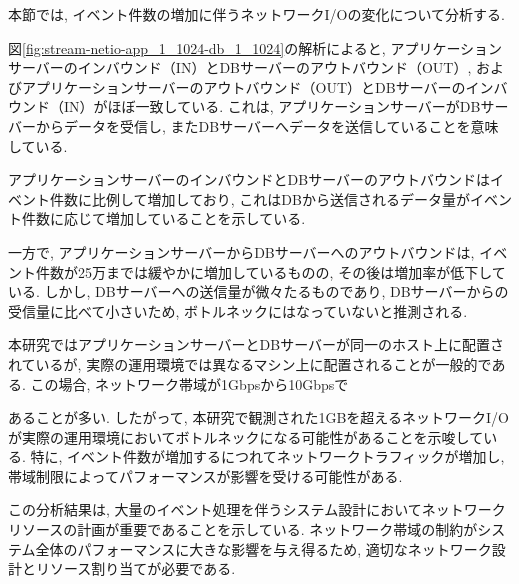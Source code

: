 \documentclass[../../../../../main]{subfiles}
\begin{document}
    \label{subsubsec:result-streaming-only-limit-diskio}

    本節では, イベント件数の増加に伴うネットワークI/Oの変化について分析する.

    

    図\ref{fig:stream-netio-app_1_1024-db_1_1024}の解析によると, アプリケーションサーバーのインバウンド（IN）とDBサーバーのアウトバウンド（OUT）, およびアプリケーションサーバーのアウトバウンド（OUT）とDBサーバーのインバウンド（IN）がほぼ一致している. これは, アプリケーションサーバーがDBサーバーからデータを受信し, またDBサーバーへデータを送信していることを意味している.

    アプリケーションサーバーのインバウンドとDBサーバーのアウトバウンドはイベント件数に比例して増加しており, これはDBから送信されるデータ量がイベント件数に応じて増加していることを示している.

    一方で, アプリケーションサーバーからDBサーバーへのアウトバウンドは, イベント件数が25万までは緩やかに増加しているものの, その後は増加率が低下している. しかし, DBサーバーへの送信量が微々たるものであり, DBサーバーからの受信量に比べて小さいため, ボトルネックにはなっていないと推測される.

    本研究ではアプリケーションサーバーとDBサーバーが同一のホスト上に配置されているが, 実際の運用環境では異なるマシン上に配置されることが一般的である. この場合, ネットワーク帯域が1Gbpsから10Gbpsで

    あることが多い. したがって, 本研究で観測された1GBを超えるネットワークI/Oが実際の運用環境においてボトルネックになる可能性があることを示唆している. 特に, イベント件数が増加するにつれてネットワークトラフィックが増加し, 帯域制限によってパフォーマンスが影響を受ける可能性がある.

    この分析結果は, 大量のイベント処理を伴うシステム設計においてネットワークリソースの計画が重要であることを示している. ネットワーク帯域の制約がシステム全体のパフォーマンスに大きな影響を与え得るため, 適切なネットワーク設計とリソース割り当てが必要である.
\end{document}
